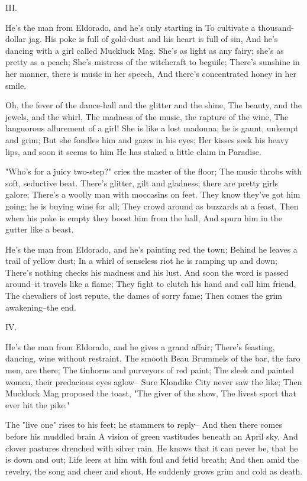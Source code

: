 \begin{poemblock}
 III.

 He's the man from Eldorado, and he's only starting in
  To cultivate a thousand-dollar jag.
 His poke is full of gold-dust and his heart is full of sin,
  And he's dancing with a girl called Muckluck Mag.
 She's as light as any fairy; she's as pretty as a peach;
  She's mistress of the witchcraft to beguile;
 There's sunshine in her manner, there is music in her speech,
  And there's concentrated honey in her smile.

 Oh, the fever of the dance-hall and the glitter and the shine,
  The beauty, and the jewels, and the whirl,
 The madness of the music, the rapture of the wine,
  The languorous allurement of a girl!
 She is like a lost madonna; he is gaunt, unkempt and grim;
  But she fondles him and gazes in his eyes;
 Her kisses seek his heavy lips, and soon it seems to him
  He has staked a little claim in Paradise.

 "Who's for a juicy two-step?" cries the master of the floor;
  The music throbs with soft, seductive beat.
 There's glitter, gilt and gladness; there are pretty girls galore;
  There's a woolly man with moccasins on feet.
 They know they've got him going; he is buying wine for all;
  They crowd around as buzzards at a feast,
 Then when his poke is empty they boost him from the hall,
  And spurn him in the gutter like a beast.

 He's the man from Eldorado, and he's painting red the town;
  Behind he leaves a trail of yellow dust;
 In a whirl of senseless riot he is ramping up and down;
  There's nothing checks his madness and his lust.
 And soon the word is passed around--it travels like a flame;
  They fight to clutch his hand and call him friend,
 The chevaliers of lost repute, the dames of sorry fame;
  Then comes the grim awakening--the end.


 IV.

 He's the man from Eldorado, and he gives a grand affair;
  There's feasting, dancing, wine without restraint.
 The smooth Beau Brummels of the bar, the faro men, are there;
  The tinhorns and purveyors of red paint;
 The sleek and painted women, their predacious eyes aglow--
  Sure Klondike City never saw the like;
 Then Muckluck Mag proposed the toast, "The giver of the show,
  The livest sport that ever hit the pike."

 The "live one" rises to his feet; he stammers to reply--
  And then there comes before his muddled brain
 A vision of green vastitudes beneath an April sky,
  And clover pastures drenched with silver rain.
 He knows that it can never be, that he is down and out;
  Life leers at him with foul and fetid breath;
 And then amid the revelry, the song and cheer and shout,
  He suddenly grows grim and cold as death.


\end{poemblock}
